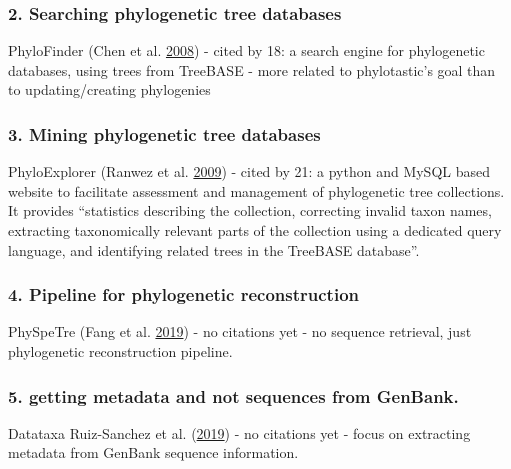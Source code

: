 \documentclass[]{article}
\begin{document}
\hypertarget{searching-phylogenetic-tree-databases}{%
\subsubsection{2. Searching phylogenetic tree databases}\label{searching-phylogenetic-tree-databases}}

PhyloFinder (Chen et al. \protect\hyperlink{ref-chen2008phylofinder}{2008}) - cited by 18: a search engine for phylogenetic databases, using
trees from TreeBASE - more related to phylotastic's goal than to updating/creating phylogenies

\hypertarget{mining-phylogenetic-tree-databases}{%
\subsubsection{3. Mining phylogenetic tree databases}\label{mining-phylogenetic-tree-databases}}

PhyloExplorer (Ranwez et al. \protect\hyperlink{ref-ranwez2009phyloexplorer}{2009}) - cited by 21: a python and MySQL based website to facilitate
assessment and management of phylogenetic tree collections. It provides ``statistics describing the collection,
correcting invalid taxon names, extracting taxonomically relevant parts of the collection
using a dedicated query language, and identifying related trees in the TreeBASE database''.

\hypertarget{pipeline-for-phylogenetic-reconstruction}{%
\subsubsection{4. Pipeline for phylogenetic reconstruction}\label{pipeline-for-phylogenetic-reconstruction}}

PhySpeTre (Fang et al. \protect\hyperlink{ref-fang2019physpetree}{2019}) - no citations yet - no sequence retrieval, just phylogenetic reconstruction
pipeline.

\hypertarget{getting-metadata-and-not-sequences-from-genbank.}{%
\subsubsection{5. getting metadata and not sequences from GenBank.}\label{getting-metadata-and-not-sequences-from-genbank.}}

Datataxa Ruiz-Sanchez et al. (\protect\hyperlink{ref-ruiz2019datataxa}{2019}) - no citations yet - focus on extracting metadata from GenBank sequence information.
\end{document}
